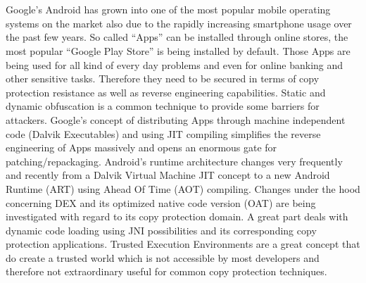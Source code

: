 \chapter*{\abstractname}
Google's Android has grown into one of the most popular mobile operating systems on the market also due to the rapidly increasing smartphone usage
over the past few years. So called ``Apps'' can be installed through
online stores, the most popular ``Google Play Store'' is being installed by default. Those Apps are being used for all kind of every day problems and
even for online banking and other sensitive tasks. Therefore they need
to be secured in terms of copy protection resistance as well as reverse
engineering capabilities. Static and dynamic obfuscation is a common
technique to provide some barriers for attackers. Google's concept of
distributing Apps through machine independent code (Dalvik Executables) and using JIT compiling simplifies the reverse engineering of Apps massively and opens an enormous gate for patching/repackaging. Android's runtime architecture changes very frequently and recently from a Dalvik Virtual Machine JIT concept to a new Android Runtime (ART) using Ahead Of Time (AOT) compiling. Changes under the hood concerning DEX and its optimized native code
version (OAT) are being investigated with regard to its copy protection domain.
A great part deals with dynamic code loading using JNI possibilities and its
corresponding copy protection applications. Trusted Execution Environments
are a great concept that do create a trusted world which is not accessible
by most developers and therefore not extraordinary useful for common copy
protection techniques.
